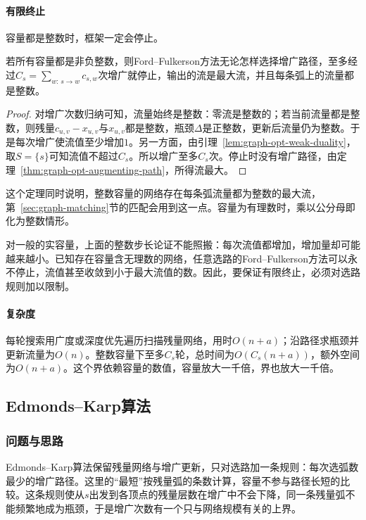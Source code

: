 \paragraph{有限终止}
容量都是整数时，框架一定会停止。

\begin{theorem}[整数容量下的有限终止]
\label{thm:graph-opt-integer-termination}
若所有容量都是非负整数，则Ford--Fulkerson方法无论怎样选择增广路径，至多经过$C_s=\sum_{w:\,s\to w}c_{s,w}$次增广就停止，输出的流是最大流，并且每条弧上的流量都是整数。
\end{theorem}

\begin{proof}
对增广次数归纳可知，流量始终是整数：零流是整数的；若当前流量都是整数，则残量$c_{u,v}-x_{u,v}$与$x_{u,v}$都是整数，瓶颈$\Delta$是正整数，更新后流量仍为整数。于是每次增广使流值至少增加$1$。另一方面，由引理~\ref{lem:graph-opt-weak-duality}，取$S=\{s\}$可知流值不超过$C_s$。所以增广至多$C_s$次。停止时没有增广路径，由定理~\ref{thm:graph-opt-augmenting-path}，所得流最大。
\end{proof}

这个定理同时说明，整数容量的网络存在每条弧流量都为整数的最大流，第~\ref{sec:graph-matching}节的匹配会用到这一点。容量为有理数时，乘以公分母即化为整数情形。

对一般的实容量，上面的整数步长论证不能照搬：每次流值都增加，增加量却可能越来越小。已知存在容量含无理数的网络，任意选路的Ford--Fulkerson方法可以永不停止，流值甚至收敛到小于最大流值的数。因此，要保证有限终止，必须对选路规则加以限制。

\paragraph{复杂度}
每轮搜索用广度或深度优先遍历扫描残量网络，用时$O(n+a)$；沿路径求瓶颈并更新流量为$O(n)$。整数容量下至多$C_s$轮，总时间为$O(C_s(n+a))$，额外空间为$O(n+a)$。这个界依赖容量的数值，容量放大一千倍，界也放大一千倍。

\subsection{Edmonds--Karp算法}
\label{sec:graph-opt-edmonds-karp}

\subsubsection{问题与思路}

Edmonds--Karp算法保留残量网络与增广更新，只对选路加一条规则：每次选弧数最少的增广路径。这里的“最短”按残量弧的条数计算，容量不参与路径长短的比较。这条规则使从$s$出发到各顶点的残量层数在增广中不会下降，同一条残量弧不能频繁地成为瓶颈，于是增广次数有一个只与网络规模有关的上界。

